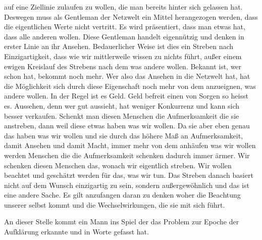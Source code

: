 auf eine Ziellinie zulaufen zu wollen, die man bereits hinter sich gelassen hat. Deswegen muss als Gentleman der Netzwelt
ein Mittel herangezogen werden, dass die eigentlichen Werte nicht vertritt. Es wird präsentiert, dass man etwas hat,
dass alle anderen wollen. Diese Gentleman handelt eigennützig und denken in erster Linie an ihr Ansehen.
Bedauerlicher Weise ist dies ein Streben nach Einzigartigkeit, dass wie wir mittlerweile wissen zu nichts führt, außer einem
ewigen Kreislauf des Strebens nach dem was andere wollen. Bekannt ist, wer schon hat, bekommt noch mehr.
Wer also das Ansehen in die Netzwelt hat, hat die Möglichkeit sich durch diese Eigenschaft noch mehr von dem
anzueignen, was andere wollen. In der Regel ist es Geld. Geld befreit einen von Sorgen so heisst es. Aussehen, denn 
wer gut aussieht, hat weniger Konkurrenz und kann sich besser verkaufen. Schenkt man diesen Menschen die Aufmerksamkeit
die sie anstreben, dann weil diese etwas haben was wir wollen. Da sie aber eben genau das haben was wir wollen und 
sie durch das höhere Maß an Aufmerksamkeit, damit Ansehen und damit Macht, immer mehr von dem anhäufen was wir wollen 
werden Menschen die die Aufmerksamkeit schenken dadurch immer ärmer. Wir schenken diesen Menschen das, wonach wir eigentlich
streben. Wir wollen beachtet und geschätzt werden für das, was wir tun. Das Streben danach basiert nicht auf dem
Wunsch einzigartig zu sein, sondern außergewöhnlich und das ist eine andere Sache. Es gilt anzufangen daran zu denken
woher die Beachtung unserer selbst kommt und die Wechselwirkungen, die sie mit sich führt.

An dieser Stelle kommt ein Mann ins Spiel
der das Problem zur Epoche der Aufklärung erkannte und in Worte gefasst hat.